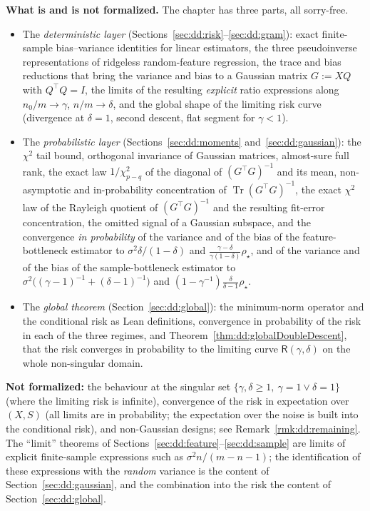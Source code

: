 \medskip\noindent\textbf{What is and is not formalized.}
The chapter has three parts, all sorry-free.
\begin{itemize}
  \item The \emph{deterministic layer} (Sections~\ref{sec:dd:risk}--\ref{sec:dd:gram}): exact finite-sample bias--variance identities for linear estimators, the three pseudoinverse representations of ridgeless
  random-feature regression, the trace and bias reductions that bring the variance and bias to a Gaussian matrix $G:=XQ$ with $Q^\top Q=I$, the limits of the resulting \emph{explicit} ratio expressions along $n_0/m\to\gamma$, $n/m\to\delta$, and the global shape
  of the limiting risk curve (divergence at $\delta=1$, second descent, flat segment for $\gamma<1$).
  \item The \emph{probabilistic layer} (Sections~\ref{sec:dd:moments} and~\ref{sec:dd:gaussian}): the $\chi^2$ tail bound, orthogonal invariance of Gaussian matrices, almost-sure full rank, the exact law $1/\chi^2_{p-q}$ of the diagonal of $(G^\top G)^{-1}$ and
  its mean, non-asymptotic and in-probability concentration of $\operatorname{Tr}(G^\top G)^{-1}$, the exact $\chi^2$ law of the Rayleigh quotient of $(G^\top G)^{-1}$ and the resulting fit-error concentration, the omitted signal of a Gaussian subspace, and
  the convergence \emph{in probability} of the variance and of the bias of the feature-bottleneck estimator to $\sigma^2\delta/(1-\delta)$ and $\frac{\gamma-\delta}{\gamma(1-\delta)}\rho_\star$, and of the variance and of the bias of the sample-bottleneck estimator to $\sigma^2\bigl((\gamma-1)^{-1}+(\delta-1)^{-1}\bigr)$ and $(1-\gamma^{-1})\frac{\delta}{\delta-1}\rho_\star$.
  \item The \emph{global theorem} (Section~\ref{sec:dd:global}): the minimum-norm operator and the conditional risk as Lean definitions, convergence in probability of the risk in each of the three regimes, and Theorem~\ref{thm:dd:globalDoubleDescent}, that the risk converges in probability to the limiting curve $\mathsf R(\gamma,\delta)$ on the whole non-singular domain.
\end{itemize}
\textbf{Not formalized:} the behaviour at the singular set $\{\gamma,\delta\ge1,\ \gamma=1\vee\delta=1\}$ (where the limiting risk is infinite), convergence of the risk in expectation over $(X,S)$ (all limits are in probability; the expectation over the noise is built into the conditional risk), and non-Gaussian designs; see Remark~\ref{rmk:dd:remaining}. The ``limit'' theorems of
Sections~\ref{sec:dd:feature}--\ref{sec:dd:sample} are limits of explicit finite-sample expressions such as $\sigma^2n/(m-n-1)$; the identification of these expressions with the \emph{random} variance is the content of Section~\ref{sec:dd:gaussian}, and the combination into the risk the content of Section~\ref{sec:dd:global}.

